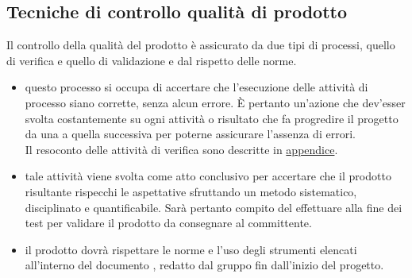 \documentclass[a4paper, titlepage]{article}
\begin{document}
\subsection{Tecniche di controllo qualità di prodotto}
Il controllo della qualità del prodotto è assicurato da due tipi di processi, quello di verifica e quello di validazione e dal rispetto delle norme.
\begin{itemize}
\item {} questo processo si occupa di accertare che l'esecuzione delle attività di processo siano corrette, senza alcun errore. È pertanto un'azione che dev'esser svolta costantemente su ogni attività o risultato che fa progredire il progetto da una  a quella successiva per poterne assicurare l'assenza di errori.
\\ Il resoconto delle attività di verifica sono descritte in \hyperref[app:valtest]{appendice}.
\\
\item {} tale attività viene svolta come atto conclusivo per accertare che il prodotto risultante rispecchi le aspettative sfruttando un metodo sistematico, disciplinato e quantificabile. Sarà pertanto compito del  effettuare alla fine dei test per validare il prodotto da consegnare al committente.
\\
\item {} il prodotto dovrà rispettare le norme e l'uso degli strumenti elencati all'interno del documento , redatto dal gruppo fin dall'inizio del progetto.
\end{itemize}
\end{document}
